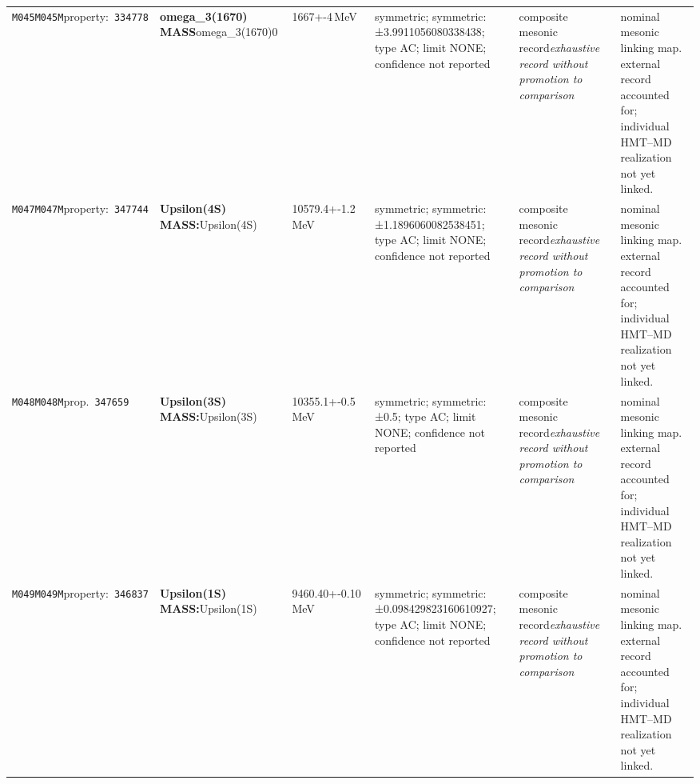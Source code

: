 \begin{landscape}
\begin{longtable}{L{1.85cm}L{4.45cm}L{2.35cm}L{4.05cm}L{3.35cm}L{7.15cm}}
\texttt{M045}\newline \texttt{M045M}\newline property:\ \texttt{334778} & \textbf{omega\_\allowbreak{}3(1670) MASS}\newline omega\_\allowbreak{}3(1670)0 & 1667+-4\,MeV & symmetric; symmetric: ±3.9911056080338438; type AC; limit NONE; confidence not reported & composite mesonic record\newline \emph{exhaustive record without promotion to comparison} & nominal mesonic linking map. external record accounted for; individual HMT--MD realization not yet linked. \\
\texttt{M047}\newline \texttt{M047M}\newline property:\ \texttt{347744} & \textbf{Upsilon(4S) MASS:}\newline Upsilon(4S) & 10579.4+-1.2\,MeV & symmetric; symmetric: ±1.1896060082538451; type AC; limit NONE; confidence not reported & composite mesonic record\newline \emph{exhaustive record without promotion to comparison} & nominal mesonic linking map. external record accounted for; individual HMT--MD realization not yet linked. \\
\texttt{M048}\newline \texttt{M048M}\newline prop.\ \texttt{347659} & \textbf{Upsilon(3S) MASS:}\newline Upsilon(3S) & 10355.1+-0.5\,MeV & symmetric; symmetric: ±0.5; type AC; limit NONE; confidence not reported & composite mesonic record\newline \emph{exhaustive record without promotion to comparison} & nominal mesonic linking map. external record accounted for; individual HMT--MD realization not yet linked. \\
\texttt{M049}\newline \texttt{M049M}\newline property:\ \texttt{346837} & \textbf{Upsilon(1S) MASS:}\newline Upsilon(1S) & 9460.40+-0.10\,MeV & symmetric; symmetric: ±0.098429823160610927; type AC; limit NONE; confidence not reported & composite mesonic record\newline \emph{exhaustive record without promotion to comparison} & nominal mesonic linking map. external record accounted for; individual HMT--MD realization not yet linked. \\

\end{longtable}
\end{landscape}

